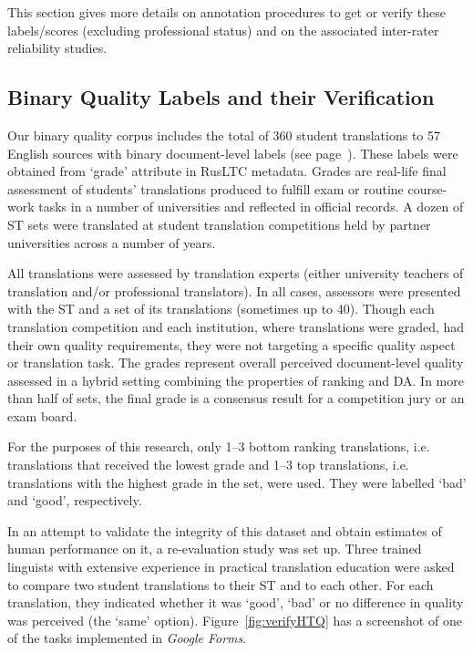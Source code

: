 This section gives more details on annotation procedures to get or verify these labels/scores (excluding professional status) and on the associated inter-rater reliability studies.

\subsection{\label{ssec:binary}Binary Quality Labels and their Verification}

Our binary quality corpus includes the total of 360 student translations to 57 English sources with binary document-level labels (see page~\pageref{pg:binary}). These labels were obtained from `grade' attribute in \gls{RusLTC} metadata. Grades are real-life final assessment of students' translations produced to fulfill exam or routine course-work tasks in a number of universities and reflected in official records. A dozen of ST sets were translated at student translation competitions held by partner universities across a number of years. 

All translations were assessed by translation experts (either university teachers of translation and/or professional translators). In all cases, assessors were presented with the ST and a set of its translations (sometimes up to 40). Though each translation competition and each institution, where translations were graded, had their own quality requirements, they were not targeting a specific quality aspect or translation task. The grades represent overall perceived document-level quality assessed in a hybrid setting combining the properties of ranking and DA. In more than half of sets, the final grade is a consensus result for a competition jury or an exam board. 

For the purposes of this research, only 1--3 bottom ranking translations, i.e. translations that received the lowest grade and 1--3 top translations, i.e. translations with the highest grade in the set,  were used. They were labelled `bad' and `good', respectively.

In an attempt to validate the integrity of this dataset and obtain estimates of human performance on it, a re-evaluation study was set up. Three trained linguists with extensive experience in practical translation education were asked to compare two student translations to their ST and to each other.
For each translation, they indicated whether it was `good', `bad' or no difference in quality was perceived (the `same' option). Figure~\ref{fig:verifyHTQ} has a screenshot of one of the tasks implemented in \textit{Google Forms}.

